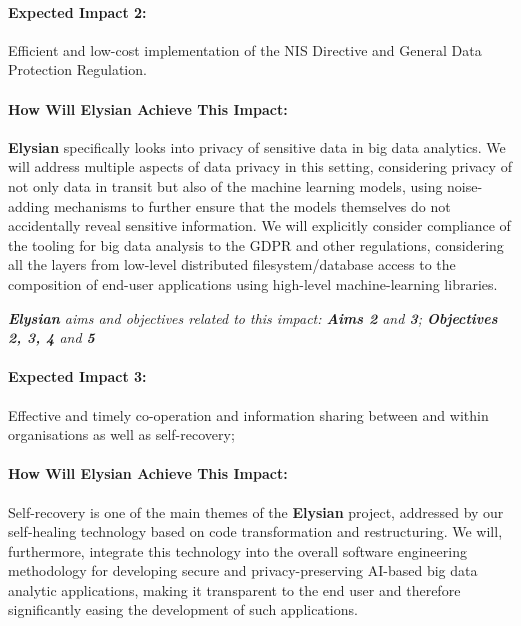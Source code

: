\documentclass[a4paper,11pt]{article}
\newcommand{\project}[1]{\textbf{#1}\xspace}
\newcommand{\SECURITY}{\project{Elysian}}
\newcommand{\TheProject}{\SECURITY}
\begin{document}
\begin{mdframed}[backgroundcolor=blue!5]
\paragraph{Expected Impact 2:}
Efficient and low-cost implementation of the NIS Directive and General Data Protection Regulation.
\end{mdframed}

\begin{mdframed}[backgroundcolor=gray!10]
\paragraph{How Will \TheProject{} Achieve This Impact:}
\TheProject{} specifically looks into privacy of sensitive data in big data analytics. We will address multiple aspects of data privacy in this setting, considering privacy of not only data in transit but also of the machine learning models, using noise-adding mechanisms to further ensure that the models themselves do not accidentally reveal sensitive information. We will explicitly consider compliance of the tooling for big data analysis to the GDPR and other regulations, considering all the layers from low-level distributed filesystem/database access to the composition of end-user applications using high-level machine-learning libraries.

\emph{\TheProject{} aims and objectives related to this impact: \textbf{Aims 2}  and \textbf{3}; \textbf{Objectives 2, 3, 4} and \textbf{5} }
\end{mdframed}

\begin{mdframed}[backgroundcolor=blue!5]
\paragraph{Expected Impact 3:}
Effective and timely co-operation and information sharing between and within organisations as well as self-recovery;
\end{mdframed}

\begin{mdframed}[backgroundcolor=gray!10]
\paragraph{How Will \TheProject{} Achieve This Impact:}
Self-recovery is one of the main themes of the \TheProject{} project, addressed by our self-healing technology based on code transformation and restructuring. We will, furthermore, integrate this technology into the overall software engineering methodology for developing secure and privacy-preserving AI-based big data analytic applications, making it transparent to the end user and therefore significantly easing the development of such applications. 
\end{mdframed}
\end{document}
